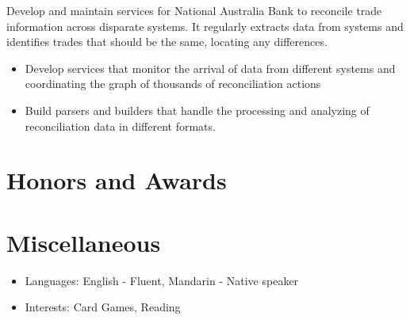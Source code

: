 \documentclass{resume}
\begin{document}
\begin{flushleft}
Develop and maintain services for National Australia Bank to reconcile trade information across disparate systems. It regularly extracts data from systems and identifies trades that should be the same, locating any differences.
\begin{itemize}
  \item Develop services that monitor the arrival of data from different systems and coordinating the graph of thousands of reconciliation actions
  \item Build parsers and builders that handle the processing and analyzing of reconciliation data in different formats.
\end{itemize}
\end{flushleft}

\section{Honors and Awards}

\section{Miscellaneous}
\begin{itemize}[parsep=0.5ex]
  \item Languages: English - Fluent, Mandarin - Native speaker
  \item Interests: Card Games, Reading
\end{itemize}
\end{document}
